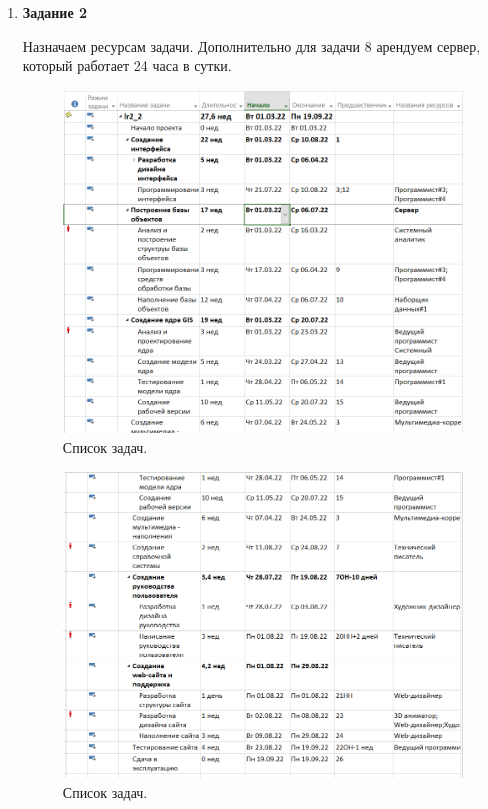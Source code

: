 \documentclass[a4paper,14pt]{extreport} %
\begin{document}
\begin{enumerate}
\item \textbf{Задание 2}

Назначаем ресурсам задачи. Дополнительно для задачи 8 арендуем сервер, который работает 24 часа в сутки. 

\begin{figure}[H]
  \centering
  \caption{Список задач. }
  \includegraphics[scale=0.6]{2}
\end{figure}

\begin{figure}[H]
	\centering
	\caption{Список задач. }
	\includegraphics[scale=0.6]{22}
\end{figure}


\end{enumerate}
\end{document}
